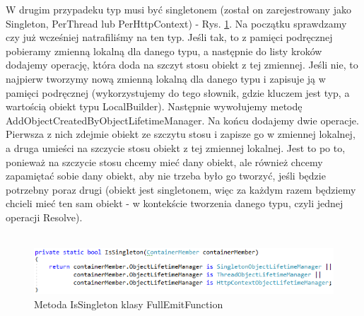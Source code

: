 \documentclass[12pt]{article}
\begin{document}
W drugim przypadeku typ musi być singletonem (został on zarejestrowany jako Singleton, PerThread lub PerHttpContext) -  Rys. \ref{fig:FullEmitFunction_IsSingleton}. Na początku sprawdzamy czy już wcześniej natrafiliśmy na ten typ. Jeśli tak, to z pamięci podręcznej pobieramy zmienną lokalną dla danego typu, a następnie do listy kroków dodajemy operację, która doda na szczyt stosu obiekt z tej zmiennej. Jeśli nie, to najpierw tworzymy nową zmienną lokalną dla danego typu i zapisuje ją w pamięci podręcznej (wykorzystujemy do tego słownik, gdzie kluczem jest typ, a wartością obiekt typu LocalBuilder). Następnie wywołujemy metodę AddObjectCreatedByObjectLifetimeManager. Na końcu dodajemy dwie operacje. Pierwsza z nich zdejmie obiekt ze szczytu stosu i zapisze go w zmiennej lokalnej, a druga umieści na szczycie stosu obiekt z tej zmiennej lokalnej. Jest to po to, ponieważ na szczycie stosu chcemy mieć dany obiekt, ale również chcemy zapamiętać sobie dany obiekt, aby nie trzeba było go tworzyć, jeśli będzie potrzebny poraz drugi (obiekt jest singletonem, więc za każdym razem będziemy chcieli mieć ten sam obiekt - w kontekście tworzenia danego typu, czyli jednej operacji Resolve).\\ \\
\begin{figure}[H]
	\begin{center}
  		\includegraphics{FullEmitFunction_IsSingleton.png}
  		\caption{Metoda IsSingleton klasy FullEmitFunction}
  		\label{fig:FullEmitFunction_IsSingleton}
	\end{center}
\end{figure}
\end{document}
